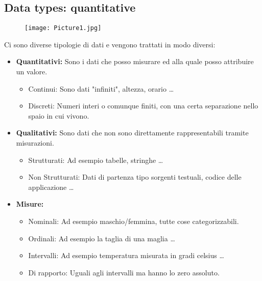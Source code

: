 \documentclass[a4paper,12pt]{article}
\begin{document}
\subsection{Data types: quantitative}
\begin{figure}[H]
  \centering
  \texttt{[image: Picture1.jpg]}
  \label{etichetta26}
\end{figure}
Ci sono diverse tipologie di dati e vengono trattati in modo diversi:
\begin{itemize}
    \item \textbf{Quantitativi: } Sono i dati che posso misurare ed alla quale posso attribuire un valore.
    \begin{itemize}
        \item Continui: Sono dati "infiniti", altezza, orario \dots
        \item Discreti: Numeri interi o comunque finiti, con una certa separazione nello spaio in cui vivono.
    \end{itemize}
    \item \textbf{Qualitativi: } Sono dati che non sono direttamente rappresentabili tramite misurazioni.
    \begin{itemize}
        \item Strutturati: Ad esempio tabelle, stringhe \dots
        \item Non Strutturati: Dati di partenza tipo sorgenti testuali, codice delle applicazione \dots
    \end{itemize}
    \item \textbf{Misure: } 
    \begin{itemize}
        \item Nominali: Ad esempio maschio/femmina, tutte cose categorizzabili.
        \item Ordinali: Ad esempio la taglia di una maglia \dots
        \item Intervalli: Ad esempio temperatura misurata in gradi celsius \dots
        \item Di rapporto: Uguali agli intervalli ma hanno lo zero assoluto.
    \end{itemize}
\end{itemize}
\end{document}
